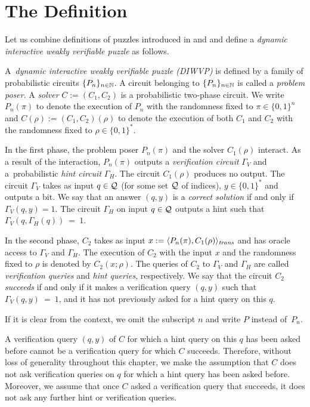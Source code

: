 \section{The Definition}
\label{section:wvp}
Let us combine definitions of puzzles introduced in \cite{dodis2009security} and \cite{holenstein2011general}
and define a \textit{dynamic interactive weakly verifiable puzzle} as follows.
\begin{definition}
  \label{def:dwvp}%
  A~\textit{dynamic interactive weakly verifiable puzzle (DIWVP)} is defined by a family of probabilistic circuits $\{P_n\}_{n \in \mathbb{N}}$.
  A circuit belonging to $\{P_n\}_{n \in \mathbb{N}}$ is called a \textit{problem poser}.
  A \textit{solver} $C := (C_1, C_2)$ is a probabilistic two-phase circuit.
  We write $P_n(\pi)$ to denote the execution of $P_n$ with the randomness fixed to $\pi \in \{0,1\}^n$ and $C(\rho) := (C_1,C_2)(\rho)$
  to denote the execution of both $C_1$ and $C_2$ with the randomness fixed to $\rho \in \{0,1\}^{*}$.

  In the first phase, the problem poser $P_n(\pi)$ and the solver $C_1(\rho)$ interact.
  As a result of the interaction, $P_n(\pi)$ outputs a \textit{verification circuit} $\Gamma_{V}$ and a~probabilistic \textit{hint circuit} $\Gamma_{H}$.
  The circuit $C_1(\rho)$ produces no output. The circuit $\Gamma_{V}$ takes as input $q \in \mathcal{Q}$ (for some set $\mathcal{Q}$ of indices),
  $y \in \{0,1\}^*$ and outputs a bit. We say that an answer $(q,y)$ is a \textit{correct solution} if and only if $\Gamma_V(q,y) = 1$.
  The circuit $\Gamma_H$ on input $q \in \mathcal{Q}$ outputs a hint such that $\Gamma_V(q,\Gamma_H(q))~=~1$.

  In the second phase, $C_2$ takes as input $x := \langle P_n(\pi), C_1(\rho) \rangle_{\operatorname{\mathit{trans}}}$
  and has oracle access to $\Gamma_V$ and $\Gamma_H$.
  The execution of $C_2$ with the input $x$ and the randomness fixed to $\rho$
  is denoted by $C_2(x; \rho)$. The queries of $C_2$ to $\Gamma_V$ and $\Gamma_H$ are called \textit{verification queries} and \textit{hint queries}, respectively.
  We say that the circuit $C_2$ \textit{succeeds} if and only if it makes a verification query $(q,y)$ such that $\Gamma_V(q,y)~=~1$,
  and it has not previously asked for a hint query on this $q$.
\end{definition}

If it is clear from the context, we omit the subscript $n$ and write $P$ instead of~$P_n$.

A verification query $(q,y)$ of $C$ for which a hint query on this $q$ has been asked before cannot be a verification query for which $C$ succeeds.
Therefore, without loss of generality throughout this chapter, we make the assumption that $C$ does not ask verification queries on $q$
for which a hint query has been asked before. Moreover, we assume that once $C$ asked a verification query that succeeds,
it does not ask any further hint or verification queries.

